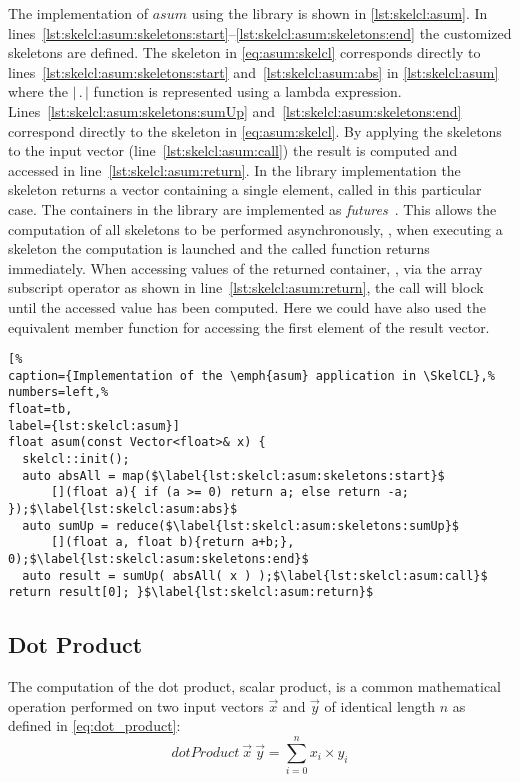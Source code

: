 The implementation of $asum$ using the \SkelCL library is shown in \autoref{lst:skelcl:asum}.
In lines~\ref{lst:skelcl:asum:skeletons:start}--\ref{lst:skelcl:asum:skeletons:end} the customized skeletons are defined.
The \map skeleton in \autoref{eq:asum:skelcl} corresponds directly to lines~\ref{lst:skelcl:asum:skeletons:start} and~\ref{lst:skelcl:asum:abs} in \autoref{lst:skelcl:asum} where the $|\, .\, |$ function is represented using a \Cpp lambda expression.
Lines~\ref{lst:skelcl:asum:skeletons:sumUp} and~\ref{lst:skelcl:asum:skeletons:end} correspond directly to the \reduce skeleton in \autoref{eq:asum:skelcl}.
By applying the skeletons to the input vector (line~\ref{lst:skelcl:asum:call}) the result is computed and accessed in line~\ref{lst:skelcl:asum:return}.
In the \SkelCL library implementation the \reduce skeleton returns a vector containing a single element, called  in this particular case.
The containers in the \SkelCL library are implemented as \emph{futures}~\cite{HewittBa1977,FriedmanWi1978}.
This allows the computation of all skeletons to be performed asynchronously, \ie, when executing a skeleton the computation is launched and the called function returns immediately.
When accessing values of the returned container, \eg, via the array subscript operator as shown in line~\ref{lst:skelcl:asum:return}, the call will block until the accessed value has been computed.
Here we could have also used the equivalent  member function for accessing the first element of the result vector.

\begin{lstlisting}[%                                                             
caption={Implementation of the \emph{asum} application in \SkelCL},%
numbers=left,%
float=tb,
label={lst:skelcl:asum}]
float asum(const Vector<float>& x) {
  skelcl::init();
  auto absAll = map($\label{lst:skelcl:asum:skeletons:start}$
      [](float a){ if (a >= 0) return a; else return -a; });$\label{lst:skelcl:asum:abs}$
  auto sumUp = reduce($\label{lst:skelcl:asum:skeletons:sumUp}$
      [](float a, float b){return a+b;}, 0);$\label{lst:skelcl:asum:skeletons:end}$
  auto result = sumUp( absAll( x ) );$\label{lst:skelcl:asum:call}$ return result[0]; }$\label{lst:skelcl:asum:return}$
\end{lstlisting}


\subsection*{Dot Product}
\label{sec:dot}
The computation of the dot product, \aka scalar product, is a common mathematical operation performed on two input vectors $\vec{x}$ and $\vec{y}$ of identical length $n$ as defined in \autoref{eq:dot_product}:
\begin{equation}
  dotProduct\ \vec{x}\ \vec{y} = \sum_{i=0}^{n} x_i \times y_i
  \label{eq:dot_product}
\end{equation}

